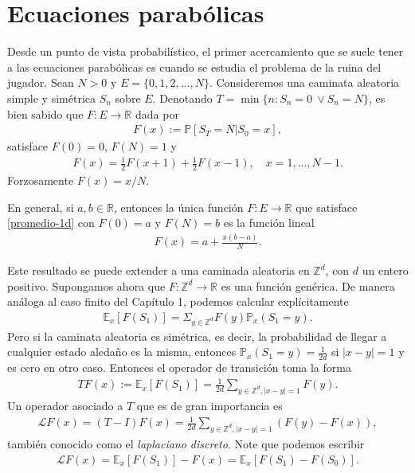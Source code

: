 \documentclass{article}
\numberwithin{equation}{section}
\begin{document}
 
\section{Ecuaciones parabólicas}


Desde un punto de vista probabilístico, el primer acercamiento que se suele tener a las ecuaciones parabólicas es cuando se estudia el problema de la ruina del jugador. Sean $N>0$ y $E = \{0,1,2,...,N\}$. Consideremos una caminata aleatoria simple y simétrica $S_n$ sobre $E$. Denotando $T = \min\{n : S_n = 0 \: \lor S_n = N \}$, es bien sabido que $F : E \to \mathbb{R}$ dada por 
\begin{align*}
    F(x) := \mathbb{P}\left[S_T = N | S_0 = x\right],
\end{align*}
satisface $F(0) = 0$, $F(N) = 1$ y
\begin{align}\label{promedio-1d}
    F(x) = \frac{1}{2}F(x+1)+\frac{1}{2}F(x-1), \quad x=1,...,N-1.
\end{align}
Forzosamente $F(x) = x/N$.


En general, si $a,b \in \mathbb{R}$, entonces la única función $F : E \to \mathbb{R}$ que satisface \eqref{promedio-1d} con $F(0) = a$ y $F(N) = b$ es la función lineal
\begin{align*}
    F(x) = a + \frac{x(b-a)}{N}.
\end{align*}

Este resultado se puede extender a una caminada aleatoria en $\mathbb{Z}^d$, con $d$ un entero positivo. Supongamos ahora que $F : \mathbb{Z}^d \to \mathbb{R}$ es una función genérica. De manera análoga al caso finito del Capítulo 1, podemos calcular explícitamente
\begin{align*}
    \mathbb{E}_x\left[F(S_1)\right] = \Sigma_{y \in \mathbb{Z}^d}F(y)\mathbb{P}_x(S_1 = y).
\end{align*}
Pero si la caminata aleatoria es simétrica, es decir, la probabilidad de llegar a cualquier estado aledaño es la misma, entonces $\mathbb{P}_x(S_1 = y) = \frac{1}{2d}$ si $|x-y| = 1$ y es cero en otro caso. Entonces el operador de transición toma la forma
\begin{align*}
    TF(x) := \mathbb{E}_x\left[F(S_1)\right] = \frac{1}{2d}\sum_{y \in \mathbb{Z}^d, |x-y| = 1}F(y).
\end{align*}
Un operador asociado a $T$ que es de gran importancia es 
\begin{align}
    \mathcal{L}F(x) = (T-I)F(x) = \frac{1}{2d}\sum_{y \in \mathbb{Z}^d, |x-y|=1}(F(y)-F(x)),
\end{align}
también conocido como el \emph{laplaciano discreto}. Note que podemos escribir 
\begin{align}
    \mathcal{L}F(x) = \mathbb{E}_x\left[F(S_1)\right] - F(x) =  \mathbb{E}_x\left[F(S_1)-F(S_0)\right].
\end{align}
\end{document}
